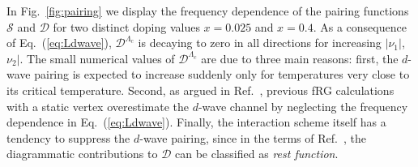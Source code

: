 \begin{widetext}
In Fig.~\ref{fig:pairing} we display the frequency dependence of the pairing functions $\mathcal{S}$ and $\mathcal{D}$ for two distinct doping values $x=0.025$ and $x=0.4$. 
As a consequence of Eq.~(\ref{eq:Ldwave}), $\mathcal{D}^{\Lambda_c}$ is decaying to zero in all directions for increasing $|\nu_1|$, $\nu_2|$.\cite{Wentzell2016a}
The small numerical values of $\mathcal{D}^{\Lambda_c}$ are due to three main reasons: 
first, the $d$-wave pairing is expected to increase suddenly only for temperatures very close to its critical temperature. 
Second, as argued in Ref.~, previous fRG calculations with a static vertex overestimate the $d$-wave channel by neglecting the frequency dependence in Eq.~(\ref{eq:Ldwave}). 
Finally, the interaction scheme itself has a tendency to suppress the $d$-wave pairing, since in the terms of Ref.~, the diagrammatic contributions to $\mathcal{D}$ can be classified as \emph{rest function}.

\end{widetext}